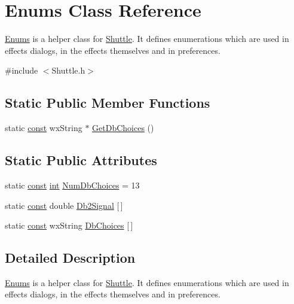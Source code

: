 \hypertarget{class_enums}{}\section{Enums Class Reference}
\label{class_enums}


\hyperlink{class_enums}{Enums} is a helper class for \hyperlink{class_shuttle}{Shuttle}. It defines enumerations which are used in effects dialogs, in the effects themselves and in preferences.  




{\ttfamily \#include $<$Shuttle.\+h$>$}

\subsection*{Static Public Member Functions}
\begin{DoxyCompactItemize}
\item 
static \hyperlink{getopt1_8c_a2c212835823e3c54a8ab6d95c652660e}{const} wx\+String $\ast$ \hyperlink{class_enums_a93eebf0af1a98c64fa3af929766f747b}{Get\+Db\+Choices} ()
\end{DoxyCompactItemize}
\subsection*{Static Public Attributes}
\begin{DoxyCompactItemize}
\item 
static \hyperlink{getopt1_8c_a2c212835823e3c54a8ab6d95c652660e}{const} \hyperlink{xmltok_8h_a5a0d4a5641ce434f1d23533f2b2e6653}{int} \hyperlink{class_enums_af68f2c8c485e9bdce28e025246d686aa}{Num\+Db\+Choices} = 13
\item 
static \hyperlink{getopt1_8c_a2c212835823e3c54a8ab6d95c652660e}{const} double \hyperlink{class_enums_a9664e8d989f758f005a661ef386d3985}{Db2\+Signal} \mbox{[}$\,$\mbox{]}
\item 
static \hyperlink{getopt1_8c_a2c212835823e3c54a8ab6d95c652660e}{const} wx\+String \hyperlink{class_enums_a9417be74f0aabc332d79926d0a244a94}{Db\+Choices} \mbox{[}$\,$\mbox{]}
\end{DoxyCompactItemize}


\subsection{Detailed Description}
\hyperlink{class_enums}{Enums} is a helper class for \hyperlink{class_shuttle}{Shuttle}. It defines enumerations which are used in effects dialogs, in the effects themselves and in preferences. 

